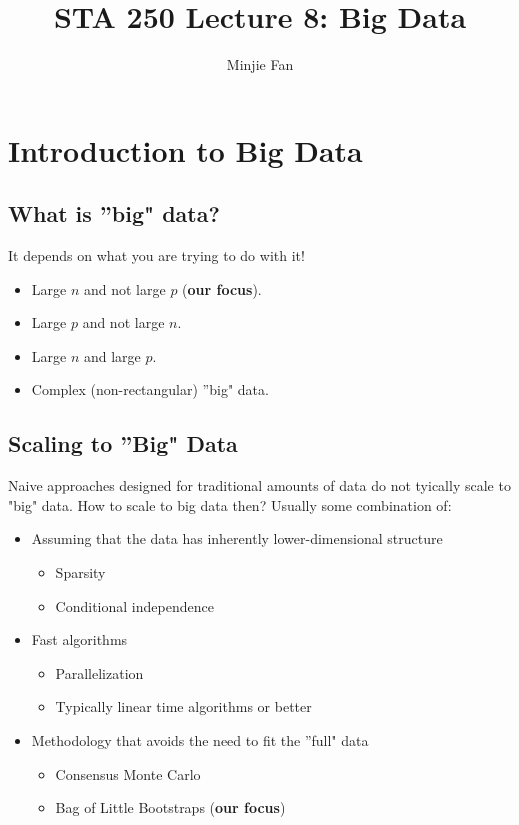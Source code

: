 \documentclass[11pt]{article}
\begin{document}
\lstset{language=R}

\title{\bf STA 250 Lecture 8: Big Data}
\author{Minjie Fan}
\maketitle

\tableofcontents

\section{Introduction to Big Data}
\subsection{What is ''big" data?}
It depends on what you are trying to do with it!
\begin{itemize}
  \item Large $n$ and not large $p$ (\textbf{our focus}).
  \item Large $p$ and not large $n$.
  \item Large $n$ and large $p$.
  \item Complex (non-rectangular) ''big" data.
\end{itemize}
\subsection{Scaling to ''Big" Data}
Naive approaches designed for traditional amounts of data do not tyically scale to "big" data. How to scale to big data then? Usually some combination of:
\begin{itemize}
  \item Assuming that the data has inherently lower-dimensional structure
    \begin{itemize}
      \item Sparsity
      \item Conditional independence
    \end{itemize}
  \item Fast algorithms
    \begin{itemize}
      \item Parallelization
      \item Typically linear time algorithms or better
    \end{itemize}
  \item Methodology that avoids the need to fit the ''full" data
    \begin{itemize}
      \item Consensus Monte Carlo
      \item Bag of Little Bootstraps (\textbf{our focus})
    \end{itemize}
\end{itemize}
\end{document}
